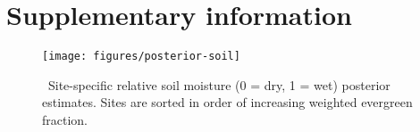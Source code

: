 \section{Supplementary information}

\begin{figure}[ht]
  \centering
  \texttt{[image: figures/posterior-soil]}
  \caption{\label{fig:posterior-soil}\
    Site-specific relative soil moisture (0 = dry, 1 = wet) posterior estimates.
    Sites are sorted in order of increasing weighted evergreen fraction.
  }
\end{figure}







